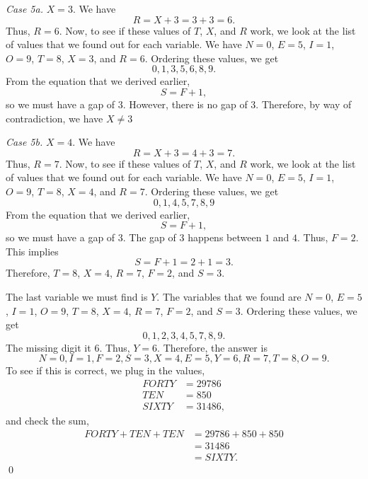 \documentclass[12pt]{article}
\begin{document}
\noindent\textit{Case 5a.} $X=3$. We have
\[R=X+3=3+3=6.\]
Thus, $R=6$. Now, to see if these values of $T$, $X$, and $R$ work, we look at the list of values that we found out for each variable. We have $N=0$, $E=5$, $I=1$, $O=9$, $T=8$, $X=3$, and $R=6$. Ordering these values, we get
\[0,1,3,5,6,8,9.\]
From the equation that we derived earlier,
\[S=F+1,\]
so we must have a gap of $3$. However, there is no gap of $3$. Therefore, by way of contradiction, we have $X\neq 3$
\vspace{20px}

\noindent\textit{Case 5b.} $X=4$. We have
\[R=X+3=4+3=7.\]
Thus, $R=7$. Now, to see if these values of $T$, $X$, and $R$ work, we look at the list of values that we found out for each variable. We have $N=0$, $E=5$, $I=1$, $O=9$, $T=8$, $X=4$, and $R=7$. Ordering these values, we get
\[0,1,4,5,7,8,9\]
From the equation that we derived earlier,
\[S=F+1,\]
so we must have a gap of $3$. The gap of $3$ happens between $1$ and $4$. Thus, $F=2$. This implies
\[S=F+1=2+1=3.\]
Therefore, $\boxed{T=8}$, $\boxed{X=4}$, $\boxed{R=7}$, $\boxed{F=2}$, and $\boxed{S=3}$.
\newpage

\noindent The last variable we must find is $Y$. The variables that we found are $N=0$, $E=5$, $I=1$, $O=9$, $T=8$, $X=4$, $R=7$, $F=2$, and $S=3$. Ordering these values, we get
\[0,1,2,3,4,5,7,8,9.\]
The missing digit it $6$. Thus, $Y=6$. Therefore, the answer is \[\boxed{N=0},\boxed{I=1},\boxed{F=2},\boxed{S=3},\boxed{X=4},\boxed{E=5},\boxed{Y=6},\boxed{R=7},\boxed{T=8},\boxed{O=9}.\]
To see if this is correct, we plug in the values,
\begin{align*}
    FORTY&=29786\\
    TEN&=850\\
    SIXTY&=31486,
\end{align*}
and check the sum,
\begin{align*}
    FORTY+TEN+TEN&=29786+850+850\\
    &=31486\\
    &=SIXTY.
\end{align*}
\qed
\end{document}

